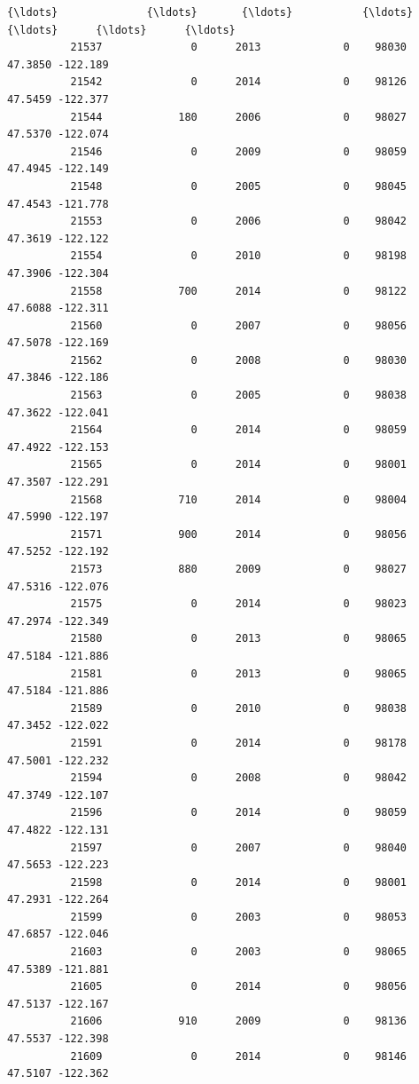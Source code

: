 \documentclass[11pt]{article}
\begin{document}
\begin{Verbatim}[commandchars=\\\{\}]
          {\ldots}              {\ldots}       {\ldots}           {\ldots}      {\ldots}      {\ldots}      {\ldots}   
          21537              0      2013             0    98030  47.3850 -122.189   
          21542              0      2014             0    98126  47.5459 -122.377   
          21544            180      2006             0    98027  47.5370 -122.074   
          21546              0      2009             0    98059  47.4945 -122.149   
          21548              0      2005             0    98045  47.4543 -121.778   
          21553              0      2006             0    98042  47.3619 -122.122   
          21554              0      2010             0    98198  47.3906 -122.304   
          21558            700      2014             0    98122  47.6088 -122.311   
          21560              0      2007             0    98056  47.5078 -122.169   
          21562              0      2008             0    98030  47.3846 -122.186   
          21563              0      2005             0    98038  47.3622 -122.041   
          21564              0      2014             0    98059  47.4922 -122.153   
          21565              0      2014             0    98001  47.3507 -122.291   
          21568            710      2014             0    98004  47.5990 -122.197   
          21571            900      2014             0    98056  47.5252 -122.192   
          21573            880      2009             0    98027  47.5316 -122.076   
          21575              0      2014             0    98023  47.2974 -122.349   
          21580              0      2013             0    98065  47.5184 -121.886   
          21581              0      2013             0    98065  47.5184 -121.886   
          21589              0      2010             0    98038  47.3452 -122.022   
          21591              0      2014             0    98178  47.5001 -122.232   
          21594              0      2008             0    98042  47.3749 -122.107   
          21596              0      2014             0    98059  47.4822 -122.131   
          21597              0      2007             0    98040  47.5653 -122.223   
          21598              0      2014             0    98001  47.2931 -122.264   
          21599              0      2003             0    98053  47.6857 -122.046   
          21603              0      2003             0    98065  47.5389 -121.881   
          21605              0      2014             0    98056  47.5137 -122.167   
          21606            910      2009             0    98136  47.5537 -122.398   
          21609              0      2014             0    98146  47.5107 -122.362   
          

\end{Verbatim}
\end{document}
